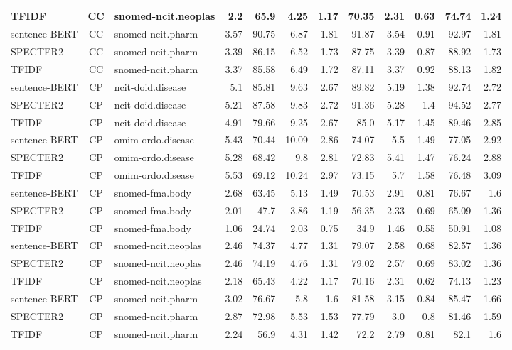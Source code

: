 \begin{table}[h]
\begin{tabular}{|l|c|l|r|r|r|r|r|r|r|r|r|}
	TFIDF  & CC & snomed-ncit.neoplas  & 2.2 & 65.9 & 4.25 & 1.17 & 70.35 & 2.31 & 0.63 & 74.74 & 1.24\\
	\hline
	sentence-BERT  & CC & snomed-ncit.pharm  & 3.57 & 90.75 & 6.87 & 1.81 & 91.87 & 3.54 & 0.91 & 92.97 & 1.81\\
	SPECTER2  & CC & snomed-ncit.pharm  & 3.39 & 86.15 & 6.52 & 1.73 & 87.75 & 3.39 & 0.87 & 88.92 & 1.73\\
	TFIDF  & CC & snomed-ncit.pharm  & 3.37 & 85.58 & 6.49 & 1.72 & 87.11 & 3.37 & 0.92 & 88.13 & 1.82\\
	\hline
	sentence-BERT  & CP & ncit-doid.disease  & 5.1 & 85.81 & 9.63 & 2.67 & 89.82 & 5.19 & 1.38 & 92.74 & 2.72\\
	SPECTER2  & CP & ncit-doid.disease  & 5.21 & 87.58 & 9.83 & 2.72 & 91.36 & 5.28 & 1.4 & 94.52 & 2.77\\
	TFIDF  & CP & ncit-doid.disease  & 4.91 & 79.66 & 9.25 & 2.67 & 85.0 & 5.17 & 1.45 & 89.46 & 2.85\\
	\hline
	sentence-BERT  & CP & omim-ordo.disease  & 5.43 & 70.44 & 10.09 & 2.86 & 74.07 & 5.5 & 1.49 & 77.05 & 2.92\\
	SPECTER2  & CP & omim-ordo.disease  & 5.28 & 68.42 & 9.8 & 2.81 & 72.83 & 5.41 & 1.47 & 76.24 & 2.88\\
	TFIDF  & CP & omim-ordo.disease  & 5.53 & 69.12 & 10.24 & 2.97 & 73.15 & 5.7 & 1.58 & 76.48 & 3.09\\
	\hline
	sentence-BERT  & CP & snomed-fma.body  & 2.68 & 63.45 & 5.13 & 1.49 & 70.53 & 2.91 & 0.81 & 76.67 & 1.6\\
	SPECTER2  & CP & snomed-fma.body  & 2.01 & 47.7 & 3.86 & 1.19 & 56.35 & 2.33 & 0.69 & 65.09 & 1.36\\
	TFIDF  & CP & snomed-fma.body  & 1.06 & 24.74 & 2.03 & 0.75 & 34.9 & 1.46 & 0.55 & 50.91 & 1.08\\
	\hline
	sentence-BERT  & CP & snomed-ncit.neoplas  & 2.46 & 74.37 & 4.77 & 1.31 & 79.07 & 2.58 & 0.68 & 82.57 & 1.36\\
	SPECTER2  & CP & snomed-ncit.neoplas  & 2.46 & 74.19 & 4.76 & 1.31 & 79.02 & 2.57 & 0.69 & 83.02 & 1.36\\
	TFIDF  & CP & snomed-ncit.neoplas  & 2.18 & 65.43 & 4.22 & 1.17 & 70.16 & 2.31 & 0.62 & 74.13 & 1.23\\
	\hline
	sentence-BERT  & CP & snomed-ncit.pharm  & 3.02 & 76.67 & 5.8 & 1.6 & 81.58 & 3.15 & 0.84 & 85.47 & 1.66\\
	SPECTER2  & CP & snomed-ncit.pharm  & 2.87 & 72.98 & 5.53 & 1.53 & 77.79 & 3.0 & 0.8 & 81.46 & 1.59\\
	TFIDF  & CP & snomed-ncit.pharm  & 2.24 & 56.9 & 4.31 & 1.42 & 72.2 & 2.79 & 0.81 & 82.1 & 1.6\\
	\hline
    \end{tabular}
\end{table}
